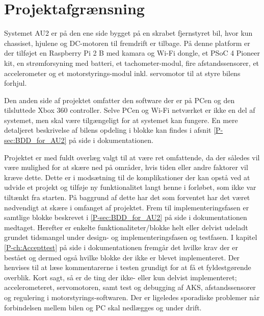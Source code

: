 \chapter{Projektafgrænsning} \label{ch:Projektafgraensning}

Systemet AU2 er på den ene side bygget på en skrabet fjernstyret bil, hvor kun chassiset, hjulene og DC-motoren til fremdrift er tilbage. 
På denne platform er der tilføjet en Raspberry Pi 2 B med kamara og Wi-Fi dongle, et PSoC 4 Pioneer kit, en strømforsyning med batteri, et tachometer-modul, fire afstandssensorer, et accelerometer og et motorstyrings-modul inkl. servomotor til at styre bilens forhjul.

Den anden side af projektet omfatter den software der er på PCen og den tilsluttede Xbox 360 controller. 
Selve PCen og Wi-Fi netværket er ikke en del af systemet, men skal være tilgængeligt for at systemet kan fungere.
En mere detaljeret beskrivelse af bilens opdeling i blokke kan findes i afsnit \ref{P-sec:BDD_for_AU2}  på side \pageref{P-sec:BDD_for_AU2} i dokumentationen. 

Projektet er med fuldt overlæg valgt til at være ret omfattende, da der således vil være mulighed for at skære ned på områder, hvis tiden eller andre faktorer vil kræve dette. 
Dette er i modsætning til de komplikationer der kan opstå ved at udvide et projekt og tilføje ny funktionalitet langt henne i forløbet, som ikke var tiltænkt fra starten. 
På baggrund af dette har det som forventet har det været nødvendigt at skære i omfanget af projektet. Frem til implementeringsfasen er samtlige blokke beskrevet i \ref{P-sec:BDD_for_AU2}  på side \pageref{P-sec:BDD_for_AU2} i dokumentationen medtaget.
Herefter er enkelte funktionaliteter/blokke helt eller delvist udeladt grundet tidsmangel under design- og implementeringsfasen og testfasen.
I kapitel \ref{P-ch:Accepttest}  på side \pageref{P-ch:Accepttest} i dokumentationen fremgår det hvilke krav der er bestået og dermed også hvilke blokke der ikke er blevet implementeret. 
Der henvises til at læse kommentarerne i testen grundigt for at få et fyldestgørende overblik. 
Kort sagt, så er de ting der ikke- eller kun delvist implementeret; accelerometeret, servomotoren, samt test og debugging af AKS, afstandssensorer og regulering i motorstyrings-softwaren. 
Der er ligeledes sporadiske problemer når forbindelsen mellem bilen og PC skal nedlægges og under drift.
